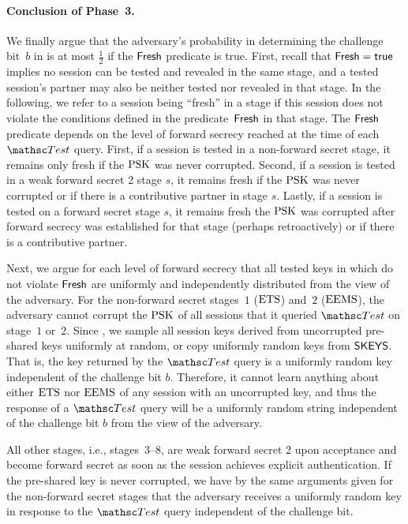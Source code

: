 	\paragraph{Conclusion of Phase~3.}
	We finally argue that the adversary's probability in determining the challenge bit~$b$ in \thisGame is at most $\tfrac{1}{2}$ if the $\mathsf{Fresh}$ predicate is true.
	First, recall that $\mathsf{Fresh} = \mathsf{true}$ implies no session can be tested and revealed in the same stage, and a tested session's partner may also be neither tested nor revealed in that stage.
	In the following, we refer to a session being ``fresh'' in a stage if this session does not violate the conditions defined in the predicate~$\mathsf{Fresh}$ in that stage.
	The $\mathsf{Fresh}$ predicate depends on the level of forward secrecy reached at the time of each $\Test$ query.
	First, if a session is tested in a non-forward secret stage, it remains only fresh if the $\mathrm{PSK}$ was never corrupted.
	Second, if a session is tested in a weak forward secret 2 stage $s$, it remains fresh if the $\mathrm{PSK}$ was never corrupted or if there is a contributive partner in stage $s$.
	Lastly, if a session is tested on a forward secret stage $s$, it remains fresh the $\mathrm{PSK}$ was corrupted after forward secrecy was established for that stage (perhaps retroactively) or if there is a contributive partner.
	
	Next, we argue for each level of forward secrecy that all tested keys in \thisGame which do not violate $\mathsf{Fresh}$ are uniformly and independently distributed from the view of the adversary.
	For the non-forward secret stages~$1$ ($\mathrm{ETS}$) and~$2$ ($\mathrm{EEMS}$), the adversary cannot corrupt the $\mathrm{PSK}$ of all sessions that it queried $\Test$ on stage~$1$ or~$2$. 
	Since , we sample all session keys derived from uncorrupted pre-shared keys uniformly at random, or copy uniformly random keys from $\mathsf{SKEYS}$. 
	That is, the key returned by the $\Test$ query is a uniformly random key independent of the challenge bit $b$.
	Therefore, it cannot learn anything about either $\mathrm{ETS}$ nor $\mathrm{EEMS}$ of any session with an uncorrupted key, and thus the response of a $\Test$ query will be a uniformly random string independent of the challenge bit $b$ from the view of the adversary.
	
	All other stages, i.e., stages~$3$--$8$, are weak forward secret 2 upon acceptance and become forward secret as soon as the session achieves explicit authentication.
	If the pre-shared key is never corrupted, we have by the same arguments given for the non-forward secret stages that the adversary receives a uniformly random key in response to the $\Test$ query independent of the challenge bit.
	
